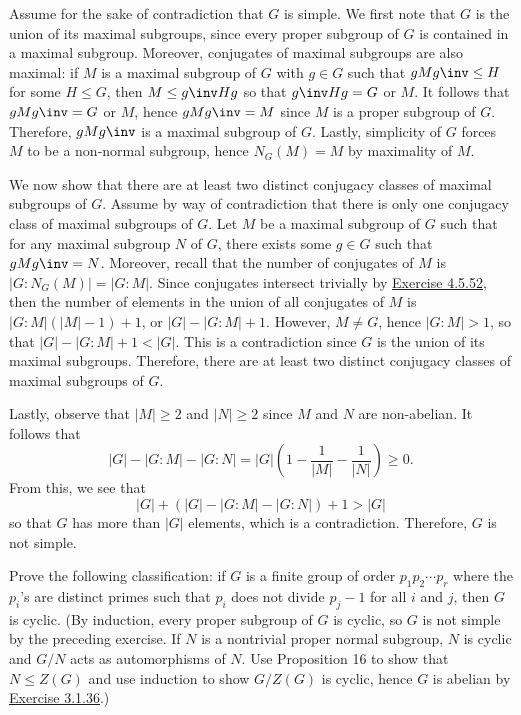 \begin{sol}
	Assume for the sake of contradiction that $G$ is simple. We first note that $G$ is the union of its maximal subgroups, since every proper subgroup of $G$ is contained in a maximal subgroup. Moreover, conjugates of maximal subgroups are also maximal: if $M$ is a maximal subgroup of $G$ with $g \in G$ such that $gMg \inv \leq H$ for some $H \leq G$, then $M \leq g\inv Hg$ so that $g\inv Hg = G$ or $M$. It follows that $gMg\inv = G$ or $M$, hence $gMg\inv = M$ since $M$ is a proper subgroup of $G$. Therefore, $gMg\inv$ is a maximal subgroup of $G$. Lastly, simplicity of $G$ forces $M$ to be a non-normal subgroup, hence $N_G(M) = M$ by maximality of $M$.

	We now show that there are at least two distinct conjugacy classes of maximal subgroups of $G$. Assume by way of contradiction that there is only one conjugacy class of maximal subgroups of $G$. Let $M$ be a maximal subgroup of $G$ such that for any maximal subgroup $N$ of $G$, there exists some $g \in G$ such that $gMg\inv = N$. Moreover, recall that the number of conjugates of $M$ is $|G : N_G(M)| = |G : M|$. Since conjugates intersect trivially by \hyperref[ex4.5.52]{Exercise 4.5.52}, then the number of elements in the union of all conjugates of $M$ is $|G : M|(|M| - 1) + 1$, or $|G| - |G : M| + 1$. However, $M \neq G$, hence $|G : M| > 1$, so that $|G| - |G : M| + 1 < |G|$. This is a contradiction since $G$ is the union of its maximal subgroups. Therefore, there are at least two distinct conjugacy classes of maximal subgroups of $G$.

	Lastly, observe that $|M| \geq 2$ and $|N| \geq 2$ since $M$ and $N$ are non-abelian. It follows that
	\[|G| - |G : M| - |G : N| = |G|\left(1 - \frac{1}{|M|} - \frac{1}{|N|}\right) \geq 0.\]
	From this, we see that
	\[|G| + (|G| - |G : M| - |G : N|) + 1 > |G|\]
	so that $G$ has more than $|G|$ elements, which is a contradiction. Therefore, $G$ is not simple.
\end{sol}

\begin{exercise}\label{ex4.5.54}
	Prove the following classification: if $G$ is a finite group of order $p_1p_2 \cdots p_r$ where the $p_i$'s are distinct primes such that $p_i$ does not divide $p_j - 1$ for all $i$ and $j$, then $G$ is cyclic. (By induction, every proper subgroup of $G$ is cyclic, so $G$ is not simple by the preceding exercise. If $N$ is a nontrivial proper normal subgroup, $N$ is cyclic and $G/N$ acts as automorphisms of $N$. Use Proposition 16 to show that $N \leq Z(G)$ and use induction to show $G/Z(G)$ is cyclic, hence $G$ is abelian by \hyperref[ex3.1.36]{Exercise 3.1.36}.)
\end{exercise}

